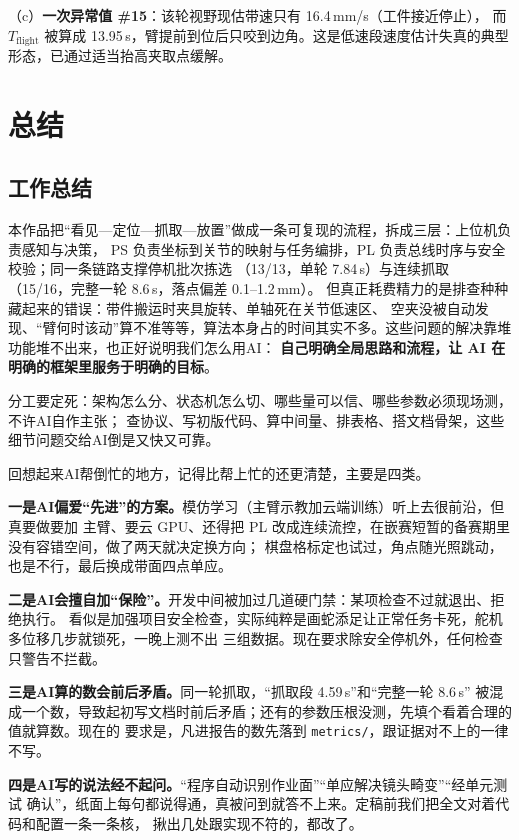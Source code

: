 \documentclass[UTF8,a4paper,zihao=5,fontset=windows]{ctexart}
\newcommand{\code}[1]{\texttt{\small #1}}
\begin{document}
（c）\textbf{一次异常值 \#15}：该轮视野现估带速只有 16.4\,mm/s（工件接近停止），
而 $T_{\text{flight}}$ 被算成 13.95\,s，臂提前到位后只咬到边角。这是低速段速度估计失真的典型形态，已通过适当抬高夹取点缓解。


\section{总结}

\subsection{工作总结}

本作品把“看见—定位—抓取—放置”做成一条可复现的流程，拆成三层：上位机负责感知与决策，
PS 负责坐标到关节的映射与任务编排，PL 负责总线时序与安全校验；同一条链路支撑停机批次拣选
（13/13，单轮 7.84\,s）与连续抓取（15/16，完整一轮 8.6\,s，落点偏差 0.1--1.2\,mm）。
但真正耗费精力的是排查种种藏起来的错误：带件搬运时夹具旋转、单轴死在关节低速区、
空夹没被自动发现、“臂何时该动”算不准等等，算法本身占的时间其实不多。这些问题的解决靠堆功能堆不出来，也正好说明我们怎么用AI：
\textbf{自己明确全局思路和流程，让 AI 在明确的框架里服务于明确的目标}。

分工要定死：架构怎么分、状态机怎么切、哪些量可以信、哪些参数必须现场测，不许AI自作主张；
查协议、写初版代码、算中间量、排表格、搭文档骨架，这些细节问题交给AI倒是又快又可靠。

回想起来AI帮倒忙的地方，记得比帮上忙的还更清楚，主要是四类。

\textbf{一是AI偏爱“先进”的方案。}模仿学习（主臂示教加云端训练）听上去很前沿，但真要做要加
主臂、要云 GPU、还得把 PL 改成连续流控，在嵌赛短暂的备赛期里没有容错空间，做了两天就决定换方向；
棋盘格标定也试过，角点随光照跳动，也是不行，最后换成带面四点单应。

\textbf{二是AI会擅自加“保险”。}开发中间被加过几道硬门禁：某项检查不过就退出、拒绝执行。
看似是加强项目安全检查，实际纯粹是画蛇添足让正常任务卡死，舵机多位移几步就锁死，一晚上测不出
三组数据。现在要求除安全停机外，任何检查只警告不拦截。

\textbf{三是AI算的数会前后矛盾。}同一轮抓取，“抓取段 4.59\,s”和“完整一轮 8.6\,s”
被混成一个数，导致起初写文档时前后矛盾；还有的参数压根没测，先填个看着合理的值就算数。现在的
要求是，凡进报告的数先落到 \code{metrics/}，跟证据对不上的一律不写。

\textbf{四是AI写的说法经不起问。}“程序自动识别作业面”“单应解决镜头畸变”“经单元测试
确认”，纸面上每句都说得通，真被问到就答不上来。定稿前我们把全文对着代码和配置一条一条核，
揪出几处跟实现不符的，都改了。
\end{document}
